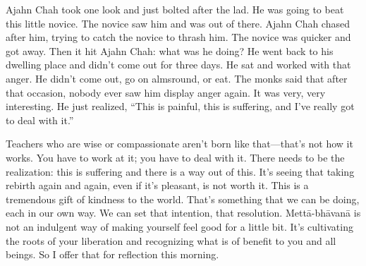 Ajahn Chah took one look and just bolted after the lad. He was going to
beat this little novice. The novice saw him and was out of there. Ajahn
Chah chased after him, trying to catch the novice to thrash him. The
novice was quicker and got away. Then it hit Ajahn Chah: what was he
doing? He went back to his dwelling place and didn’t come out for three
days. He sat and worked with that anger. He didn’t come out, go on
almsround, or eat. The monks said that after that occasion, nobody ever
saw him display anger again. It was very, very interesting. He just
realized, “This is painful, this is suffering, and I’ve really got to
deal with it.”

Teachers who are wise or compassionate aren’t born like that—that’s not
how it works. You have to work at it; you have to deal with it. There
needs to be the realization: this is suffering and there is a way out of
this. It’s seeing that taking rebirth again and again, even if it’s
pleasant, is not worth it. This is a tremendous gift of kindness to the
world. That’s something that we can be doing, each in our own way. We
can set that intention, that resolution. Mettā-bhāvanā is not an
indulgent way of making yourself feel good for a little bit. It’s
cultivating the roots of your liberation and recognizing what is of
benefit to you and all beings. So I offer that for reflection this
morning.
